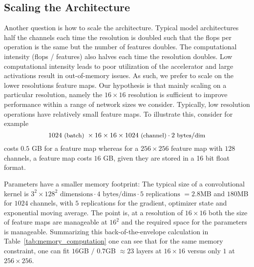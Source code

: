 \subsection{Scaling the Architecture}
Another question is how to scale the architecture. Typical model architectures half the channels each time the resolution is doubled such that the flops per operation is the same but the number of features doubles. The computational intensity (flops / features) also halves each time the resolution doubles. Low computational intensity leads to poor utilization of the accelerator and large activations result in out-of-memory issues. As such, we prefer to scale on the lower resolutions feature maps. Our hypothesis is that mainly scaling on a particular resolution, namely the $16 \times 16$ resolution is sufficient to improve performance within a range of network sizes we consider. Typically, low resolution operations have relatively small feature maps. To illustrate this, consider for example
\begin{equation*} \small
1024 \text{ (batch) } \times 16 \times 16 \times 1024 \text{ (channel)} \cdot 2 \text{ bytes} / \text{dim}
\end{equation*}
costs $0.5$ GB for a feature map whereas for a $256 \times 256$ feature map with $128$ channels, a feature map costs $16$ GB, given they are stored in a 16 bit float format. 

Parameters have a smaller memory footprint: The typical size of a convolutional kernel is $3^2 \times 128^2  \text{ dimensions} \cdot 4 \text{ bytes} / \text{dims} \cdot 5 \text{ replications } = 2.8$MB and $180$MB for $1024$ channels, with $5$ replications for the gradient, optimizer state and exponential moving average. The point is, at a resolution of $16 \times 16$ both the size of feature maps are manageable at $16^2$ and the required space for the parameters is manageable. Summarizing this back-of-the-envelope calculation in Table~\ref{tab:memory_computation} one can see that for the same memory constraint, one can fit $16$GB $/$ $0.7$GB $\approx 23$ layers at $16 \times 16$ versus only $1$ at $256 \times 256$.

\begin{table}
    \centering
    \caption{Memory and compute for a convolutional layer at the typical sizes encountered in diffusion architectures. Using more channels is usually much cheaper at lower resolutions in terms of memory, $B=1024$ for this example.}
    \label{tab:memory_computation}
    \vspace{-.4cm}
\end{table}

